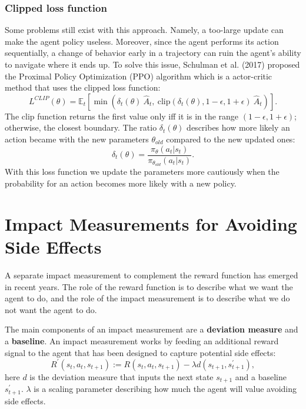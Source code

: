 \documentclass[12pt,A4]{report}
\theoremstyle{definition}
\begin{document}
\subsubsection{Clipped loss function}
Some problems still exist with this approach. Namely, a too-large update can make the agent policy useless. Moreover, since the agent performs its action sequentially, a change of behavior early in a trajectory can ruin the agent's ability to navigate where it ends up. To solve this issue, Schulman et al. (2017) proposed the Proximal Policy Optimization (PPO) algorithm which is a actor-critic method that uses the clipped loss function:
\[L^{CLIP}(\theta) = \mathbb{E}_t \left [ \min(\delta_t(\theta) \ \hat{A}_t,\ 
\text{clip}(\delta_t(\theta), 1 - \epsilon, 1 + \epsilon) \ \hat{A}_t) \right ]. \]
The clip function returns the first value only iff it is in the range $(1-\epsilon, 1+\epsilon)$; otherwise, the closest boundary. The ratio $\delta_t(\theta)$ describes how more likely an action became with the new parameters $\theta_{old}$ compared to the new updated ones:
\[ \delta_t(\theta) = \frac{\pi_\theta(a_t| s_t)}{\pi_{\theta_{old}}(a_t|s_t)}. \]
With this loss function we update the parameters more cautiously when the probability for an action becomes more likely with a new policy. 


\section{Impact Measurements for Avoiding Side Effects}

A separate impact measurement to complement the reward function has emerged in recent years. The role of the reward function is to describe what we want the agent to do, and the role of the impact measurement is to describe what we do not want the agent to do. 

The main components of an impact measurement are a \textbf{deviation measure} and a \textbf{baseline}. An impact measurement works by feeding an additional reward signal to the agent that has been designed to capture potential side effects:
\[ R^\prime(s_t, a_t, s_{t+1}) := R(s_t, a_t, s_{t+1}) - \lambda d(s_{t+1
}, s_{t+1}^\prime), \]
here $d$ is the deviation measure that inputs the next state $s_{t+1}$ and a baseline $s_{t+1}^\prime$. $\lambda$ is a scaling parameter describing how much the agent will value avoiding side effects.
\end{document}
